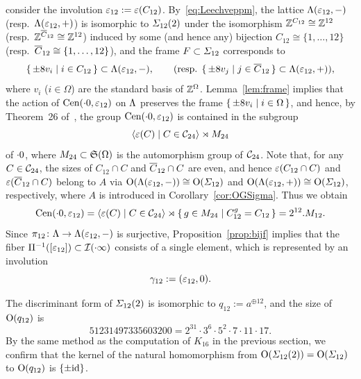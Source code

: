 \documentclass{amsart} %
\begin{document}
consider the involution 
$\varepsilon_{12}:=\varepsilon(C_{12})$.
%
By~\eqref{eq:Leechveppm}, 
the lattice $\Lambda (\varepsilon_{12}, -)$ (resp.~$\Lambda (\varepsilon_{12}, +)$)
is isomorphic 
 to $\varSigma_{12} (2)$ under 
the isomorphism $\mathord{\mathbb{Z}}^{C_{12}}\cong \mathord{\mathbb{Z}}^{12}$ (resp.~$\mathord{\mathbb{Z}}^{\overline{C}_{12}}\cong \mathord{\mathbb{Z}}^{12}$)
induced by some (and hence any) bijection 
$C_{12}\cong \{1, \dots, 12\}$ (resp.~$\overline{C}_{12}\cong \{1, \dots, 12\}$),
and the frame $F\subset \varSigma_{12}$ corresponds to
\[
\{\,{\pm 8 v_i}\mid {i\in C_{12}} \,\}\subset \Lambda(\varepsilon_{12}, -),
\qquad 
(\textrm{resp. }
\{\,{\pm 8 v_j}\mid {j\in \overline{C}_{12}} \,\}\subset \Lambda(\varepsilon_{12}, +)),
\]
where $v_i$ ($i\in \Omega$) are the standard basis of $\mathord{\mathbb{Z}}^{\Omega}$.
Lemma~\ref{lem:frame}
implies that the action of $\mathrm{Cen}(\cdot 0, \varepsilon_{12})$ 
on $\Lambda$ preserves the frame $\{\,{\pm 8 v_i}\mid {i\in \Omega} \,\}$,
and hence, by Theorem~26 of~\cite[Chapter~10, Section~3.3]{theCSbook}, 
the group $\mathrm{Cen}(\cdot 0, \varepsilon_{12}) $ is contained 
in the subgroup
\[
\langle {\varepsilon(C) \mid C \in \mathord{\mathcal{C}}_{24}} \rangle\rtimes M_{24} 
\]
of $\cdot 0$,
where $M_{24}\subset \mathord{\mathfrak{S}}(\Omega)$ is the automorphism group of $ \mathord{\mathcal{C}}_{24}$.
Note that, for any $C\in \mathord{\mathcal{C}}_{24}$,
the sizes of $C_{12}\cap C$ and $\overline{C}_{12}\cap C$
are even, and hence 
$\varepsilon(C_{12}\cap C)$ and $\varepsilon( \overline{C}_{12}\cap C)$ belong to $ A$ via 
$ \mathord{\mathrm{O}}(\Lambda(\varepsilon_{12}, -))\cong \mathord{\mathrm{O}}(\varSigma_{12})$ and $ \mathord{\mathrm{O}}(\Lambda(\varepsilon_{12}, +))\cong \mathord{\mathrm{O}}(\varSigma_{12})$,
respectively,
where $A$ is introduced in Corollary~\ref{cor:OGSigma}.
Thus we obtain 
%
\begin{equation}\label{eq:M12}
\mathrm{Cen}(\cdot 0, \varepsilon_{12})=\langle {\varepsilon(C) \mid C \in \mathord{\mathcal{C}}_{24}} \rangle\rtimes \{\,{g\in M_{24}}\mid {C_{12}^g=C_{12}} \,\}=2^{12}. M_{12}.
\end{equation}
%
Since $\pi_{12}\colon \Lambda\to \Lambda(\varepsilon_{12}, -)$ is surjective,
Proposition~\ref{prop:bijf} implies that the fiber $\Pi^{-1} ([\varepsilon_{12}])\subset \mathord{\mathcal{I}}(\cdot \infty)$ consists of a single element,
 which is 
 represented by an involution 
 \[
 \gamma_{12}:=(\varepsilon_{12}, 0).
 \]
 \begin{remark}\label{rem:q12}
 The discriminant form of $\varSigma_{12}(2)$ is isomorphic to
 $q_{12}:=a^{\oplus 12}$, 
and the size of $\mathord{\mathrm{O}}(q_{12})$ is 
\[
51231497335603200={2}^{31} \cdot {3}^{6} \cdot {5}^{2} \cdot {7} \cdot {11} \cdot {17}.
\]
 By the same method as the computation of $K_{16}$ in the previous section,
 we confirm that the kernel of the natural homomorphism from 
 $\mathord{\mathrm{O}}(\varSigma_{12}(2))=\mathord{\mathrm{O}}(\varSigma_{12})$ to $\mathord{\mathrm{O}}(q_{12})$ 
 is $\{\pm \mathord{\mathrm{id}}\}$.
 \end{remark}
\end{document}
